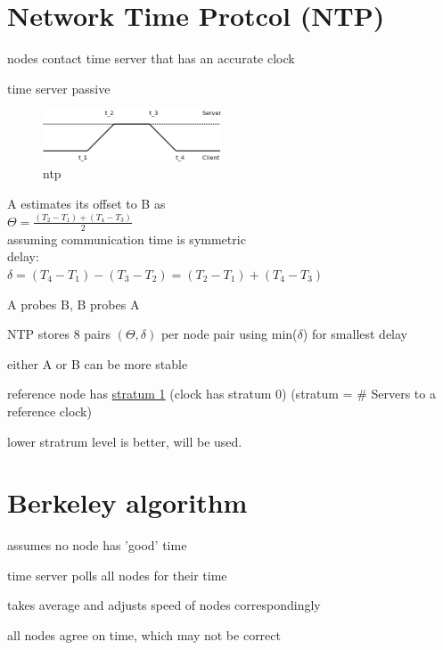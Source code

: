 \documentclass[ngerman,a4paper]{report}
\begin{document}
\section{Network Time Protcol (NTP)}
\begin{compactitem}
\item nodes contact time server that has an accurate clock
\item time server passive\\

\begin{figure}[h]
	\centering
	\includegraphics[width=200px]{gfx/ntp.png}
	\caption{ntp}
	\label{img:ntp}
\end{figure}

A estimates its offset to B as\\
$\Theta = \frac{(T_2 - T_1) + (T_4 - T_3)}{2}$\\
assuming communication time is symmetric\\
delay:\\
$\delta = (T_4 - T_1) - (T_3 - T_2) =  (T_2 - T_1) + (T_4 - T_3)$
\item A probes B, B probes A
\item NTP stores 8 pairs $(\Theta, \delta)$ per node pair using min($\delta$) for smallest delay
\item either A or B can be more stable
\item reference node has \underline{stratum  1} (clock has stratum 0) (stratum = \# Servers to a reference clock)
\item lower stratrum level is better, will be used.
\end{compactitem}

\section{Berkeley algorithm}
\begin{compactitem}
\item assumes no node has 'good' time
\item time server polls all nodes for their time
\item takes average and adjusts speed of nodes correspondingly
\item all nodes agree on time, which may not be correct
\end{compactitem}
\end{document}
